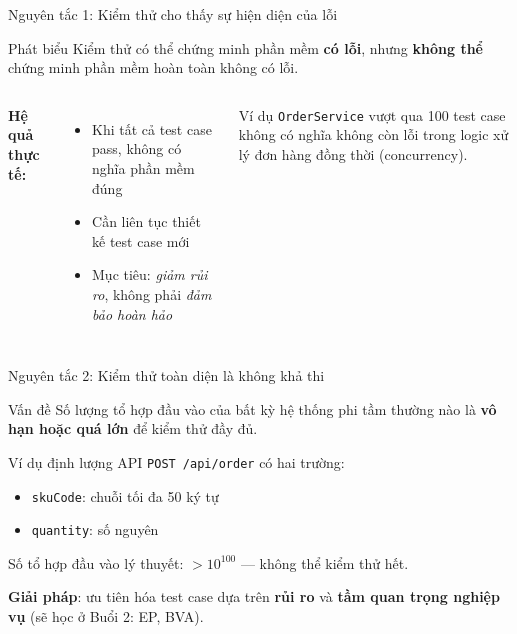 \documentclass[aspectratio=169,12pt]{beamer}
\begin{document}
\begin{frame}{Nguyên tắc 1: Kiểm thử cho thấy sự hiện diện của lỗi}
  \begin{block}{Phát biểu}
    Kiểm thử có thể chứng minh phần mềm \textbf{có lỗi}, nhưng \textbf{không thể}
    chứng minh phần mềm hoàn toàn không có lỗi.
  \end{block}

  \vspace{0.5em}
  \begin{columns}
    \textbf{Hệ quả thực tế:}
    \begin{itemize}
      \item Khi tất cả test case pass, không có nghĩa phần mềm đúng
      \item Cần liên tục thiết kế test case mới
      \item Mục tiêu: \textit{giảm rủi ro}, không phải \textit{đảm bảo hoàn hảo}
    \end{itemize}

    \begin{exampleblock}{Ví dụ}
      \texttt{OrderService} vượt qua 100 test case không có nghĩa không còn
      lỗi trong logic xử lý đơn hàng đồng thời (concurrency).
    \end{exampleblock}
  \end{columns}
\end{frame}

\begin{frame}{Nguyên tắc 2: Kiểm thử toàn diện là không khả thi}
  \begin{block}{Vấn đề}
    Số lượng tổ hợp đầu vào của bất kỳ hệ thống phi tầm thường nào
    là \textbf{vô hạn hoặc quá lớn} để kiểm thử đầy đủ.
  \end{block}

  \vspace{0.5em}
  \begin{exampleblock}{Ví dụ định lượng}
    API \texttt{POST /api/order} có hai trường:
    \begin{itemize}
      \item \texttt{skuCode}: chuỗi tối đa 50 ký tự
      \item \texttt{quantity}: số nguyên
    \end{itemize}
    Số tổ hợp đầu vào lý thuyết: $> 10^{100}$ --- không thể kiểm thử hết.
  \end{exampleblock}

  \vspace{0.3em}
  \textbf{Giải pháp}: ưu tiên hóa test case dựa trên \textbf{rủi ro} và
  \textbf{tầm quan trọng nghiệp vụ} (sẽ học ở Buổi 2: EP, BVA).
\end{frame}
\end{document}
